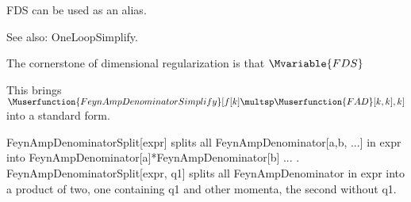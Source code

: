FDS can be used as an alias.



See also:  OneLoopSimplify.


The cornerstone of dimensional regularization is that \(\Mvariable{FDS}\)



This brings \(\Muserfunction{FeynAmpDenominatorSimplify}[f[k]\multsp \Muserfunction{FAD}[k,k],k]\) into a standard form.














FeynAmpDenominatorSplit[expr] splits all FeynAmpDenominator[a,b, ...] in expr into FeynAmpDenominator[a]*FeynAmpDenominator[b] ... .
  FeynAmpDenominatorSplit[expr, q1] splits all FeynAmpDenominator in expr into a product of two, one containing q1 and other momenta, the
  second without q1.

